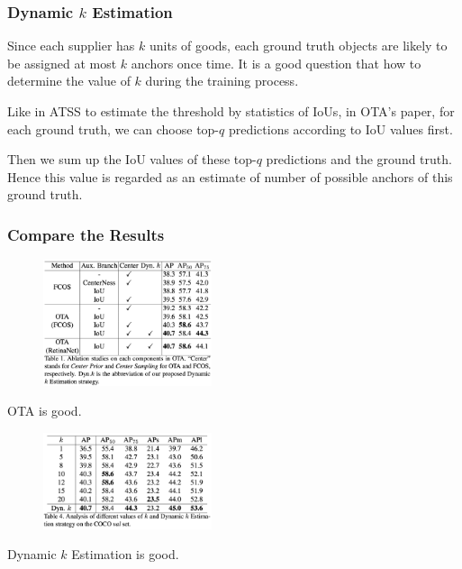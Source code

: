 \documentclass[slidetop, mathserif, dvipsnames]{beamer}
\begin{document}
\begin{frame}
    \frametitle{Dynamic $k$ Estimation}

    Since each supplier has $k$ units of goods, each ground truth objects are
    likely to be assigned at most $k$ anchors once time.
    It is a good question that how to determine the value of $k$ during the 
    training process.

    \quad

    Like in ATSS to estimate the threshold by statistics of IoUs,
    in OTA's paper, for each ground truth, we can choose top-$q$ predictions
    according to IoU values first.

    \quad 

    Then we sum up the IoU values of these top-$q$ predictions and the ground
    truth. Hence this value is regarded as an estimate of number of possible
    anchors of this ground truth.

\end{frame}

\begin{frame}
    \frametitle{Compare the Results}

    \begin{minipage}{5cm}
    \begin{figure}
        \includegraphics[width=140pt]{pics/ota_compare1.png}
    \end{figure}
    OTA is good.
    \end{minipage}
    \begin{minipage}{5cm}
    \begin{figure}
        \includegraphics[width=140pt]{pics/ota_compare2.png}
    \end{figure}
    Dynamic $k$ Estimation is good.

    \quad

    \quad

    \end{minipage}

\end{frame}
\end{document}

